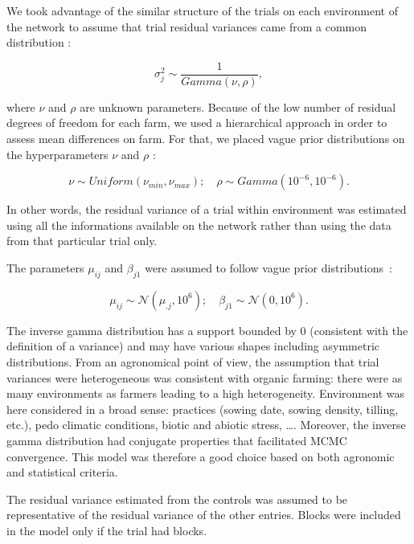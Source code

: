 \documentclass{article}\usepackage[]{graphicx}\usepackage[]{color}
\begin{document}
We took advantage of the similar structure of the trials on each environment of the network to assume that trial residual variances came from a common distribution :

\begin{displaymath}
	\sigma^2_{j} \sim \frac{1}{Gamma(\nu,\rho)},
\end{displaymath}

where $\nu$ and $\rho$ are unknown parameters.
Because of the low number of residual degrees of freedom for each farm, we used a hierarchical approach in order to assess mean differences on farm.
For that, we placed vague prior distributions on the hyperparameters $\nu$ and $\rho$ :

\begin{displaymath}
	\nu \sim Uniform(\nu_{min},\nu_{max}) ; \quad \rho \sim Gamma(10^{-6},10^{-6}).
\end{displaymath}


In other words, the residual variance of a trial within environment was estimated using all the informations available on the network rather than using the data from that particular trial only.

The parameters $\mu_{ij}$ and $\beta_{j1}$ were assumed to follow vague prior distributions~:

\begin{displaymath}
	\mu_{ij} \sim \mathcal{N}(\mu_{.j},10^{6}); \quad \beta_{j1} \sim \mathcal{N}(0,10^{6}).
\end{displaymath}


The inverse gamma distribution has a support bounded by 0 (consistent with the definition of a variance) and may have various shapes including asymmetric distributions.
From an agronomical point of view, the assumption that trial variances were heterogeneous was consistent with organic farming: there were as many environments as farmers leading to a high heterogeneity.
Environment was here considered in a broad sense: practices (sowing date, sowing density, tilling, etc.), pedo climatic conditions, biotic and abiotic stress, \dots \citep{desclaux_changes_2008}.
Moreover, the inverse gamma distribution had conjugate properties that facilitated MCMC convergence.
This model was therefore a good choice based on both agronomic and statistical criteria.

The residual variance estimated from the controls was assumed to be representative of the residual variance of the other entries.
Blocks were included in the model only if the trial had blocks.
\end{document}
